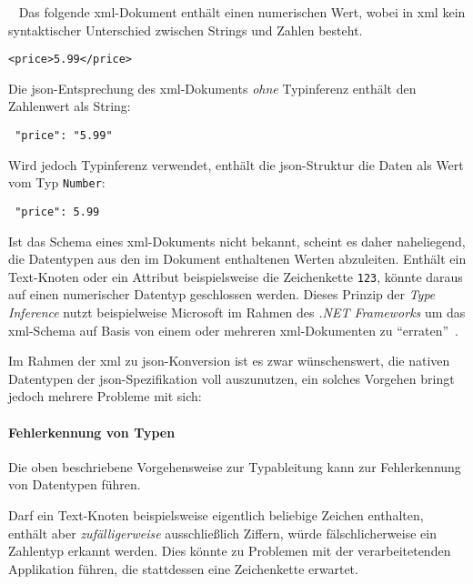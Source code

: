 \begin{example}~
    Das folgende \acrshort{xml}-Dokument enthält einen numerischen Wert, wobei in \acrshort{xml} kein syntaktischer Unterschied zwischen Strings und Zahlen besteht.
    \begin{center}
        \texttt{<price>5.99</price>}
    \end{center}
Die \acrshort{json}-Entsprechung des \acrshort{xml}-Dokuments \emph{ohne} Typinferenz enthält den Zahlenwert als String:
    \begin{center}
        \texttt{{ "price": "5.99" }}
    \end{center}
Wird jedoch Typinferenz verwendet, enthält die \acrshort{json}-Struktur die Daten als Wert vom Typ \texttt{Number}:
    \begin{center}
        \texttt{{ "price":  5.99  }}
    \end{center}
\end{example}

Ist das Schema eines \acrshort{xml}-Dokuments nicht bekannt, scheint es daher naheliegend, die Datentypen aus den im Dokument enthaltenen Werten abzuleiten. Enthält ein Text-Knoten oder ein Attribut beispielsweise die Zeichenkette \texttt{123}, könnte daraus auf einen numerischer Datentyp geschlossen werden. Dieses Prinzip der \emph{Type Inference} nutzt beispielweise Microsoft im Rahmen des \emph{.NET Frameworks} um das \acrshort{xml}-Schema auf Basis von einem oder mehreren \acrshort{xml}-Dokumenten zu \enquote{erraten}~\cite{msdn2017inferxmlschema}.

Im Rahmen der \acrshort{xml} zu \acrshort{json}-Konversion ist es zwar wünschenswert, die nativen Datentypen der \acrshort{json}-Spezifikation voll auszunutzen, ein solches Vorgehen bringt jedoch mehrere Probleme mit sich:

\paragraph{Fehlerkennung von Typen}

Die oben beschriebene Vorgehensweise zur Typableitung kann zur Fehlerkennung von Datentypen führen.

Darf ein Text-Knoten beispielsweise eigentlich beliebige Zeichen enthalten, enthält aber \emph{zufälligerweise} ausschließlich Ziffern, würde fälschlicherweise ein Zahlentyp erkannt werden. Dies könnte zu Problemen mit der verarbeitetenden Applikation führen, die stattdessen eine Zeichenkette erwartet.

